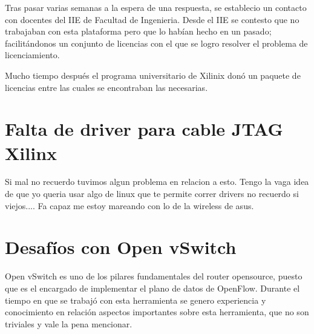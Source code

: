 Tras pasar varias semanas a la espera de una respuesta, se establecio un contacto con docentes del IIE de Facultad de Ingenieria. Desde el IIE se contesto que no trabajaban con esta plataforma pero que lo hab\'ian hecho en un pasado; facilit\'andonos un conjunto de licencias con el que se logro resolver el problema de licenciamiento. 

Mucho tiempo despu\'es el programa universitario de Xilinix don\'o un paquete de licencias entre las cuales se encontraban las necesarias.

\section{Falta de driver para cable JTAG Xilinx}
Si mal no recuerdo tuvimos algun problema en relacion a esto. Tengo la vaga idea de que yo queria usar algo de linux que te permite correr drivers no recuerdo si viejos.... Fa capaz me estoy mareando con lo de la wireless de asus.

\section{Desaf\'ios con Open vSwitch}
\label{apendiceB5}

Open vSwitch es uno de los pilares fundamentales del router opensource, puesto que es el encargado de implementar el plano de datos de OpenFlow. Durante el tiempo en que se trabaj\'o con esta herramienta se genero experiencia y conocimiento en relaci\'on aspectos importantes sobre esta herramienta, que no son triviales y vale la pena mencionar.\\ 

